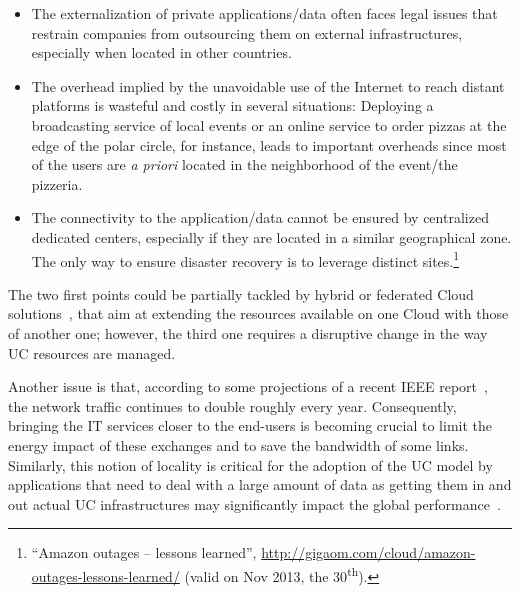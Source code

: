 \begin{itemize}
\item The externalization of private applications/data often faces legal issues that
  restrain companies from outsourcing them on external infrastructures, especially when
  located in other countries.
\item The overhead implied by the unavoidable use of the Internet to reach distant
  platforms is wasteful and costly in several situations: Deploying a broadcasting service
  of local events or an online service to order pizzas at the edge of the polar circle,
  for instance, leads to important overheads since most of the users are \emph{a priori}
  located in the neighborhood of the event/the pizzeria.
\item The connectivity to the application/data cannot be ensured by centralized dedicated
  centers, especially if they are located in a similar geographical zone. The only way to
  ensure disaster recovery is to leverage distinct sites.\footnote{``Amazon outages –
    lessons learned'',
    \href{http://gigaom.com/cloud/amazon-outages-lessons-learned/}{http://gigaom.com/cloud/amazon-outages-lessons-learned/}
    (valid on Nov 2013, the 30\textsuperscript{th}).}
\end{itemize}

The two first points could be partially tackled by hybrid or federated Cloud
solutions~\cite{armbrust:2010}, that aim at extending the resources available on one Cloud
with those of another one; however, the third one requires a disruptive change in the way
UC resources are managed.

Another issue is that, according to some projections of a recent IEEE
report~\cite{ieeenetreport:2012}, the network traffic continues to double roughly every
year. Consequently, bringing the IT services closer to the end-users is becoming crucial
to limit the energy impact of these exchanges and to save the bandwidth of some
links. Similarly, this notion of locality is critical for the adoption of the UC
model by applications that need to deal with a large amount of data as getting them in and
out actual UC infrastructures may significantly impact the global
performance~\cite{Fos11}.

